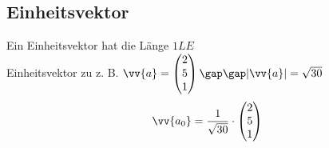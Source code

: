 \subsection{Einheitsvektor}
Ein Einheitsvektor hat die Länge $1LE$ \\
Einheitsvektor zu z. B. $\vv{a} = \begin{pmatrix}2 \\ 5 \\ 1\end{pmatrix} \gap\gap |\vv{a}| = \sqrt{30}$
\begin{gather*}
  \vv{a_0} = \frac{1}{\sqrt{30}} \cdot \begin{pmatrix}2 \\ 5 \\ 1\end{pmatrix}
\end{gather*}
